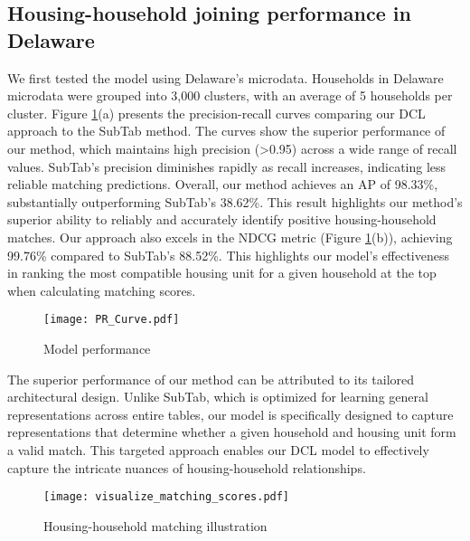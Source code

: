 \documentclass[]{nature_mod}
\begin{document}
\subsection{Housing-household joining performance in Delaware}\label{sec:hu_matching}

We first tested the model using Delaware's microdata. Households in Delaware microdata were grouped into 3,000 clusters, with an average of 5 households per cluster. Figure \ref{fig:pr_curves}(a) presents the precision-recall curves comparing our DCL approach to the SubTab method. The curves show the superior performance of our method, which maintains high precision (>0.95) across a wide range of recall values. SubTab's precision diminishes rapidly as recall increases, indicating less reliable matching predictions. Overall, our method achieves an AP of 98.33\%, substantially outperforming SubTab's 38.62\%. This result highlights our method's superior ability to reliably and accurately identify positive housing-household matches. Our approach also excels in the NDCG metric (Figure \ref{fig:pr_curves}(b)), achieving 99.76\% compared to SubTab's 88.52\%. This highlights our model's effectiveness in ranking the most compatible housing unit for a given household at the top when calculating matching scores.

\begin{figure}[!ht]
  \centering
  \texttt{[image: PR\_Curve.pdf]}
  \caption{Model performance}
  \label{fig:pr_curves}
\end{figure}

The superior performance of our method can be attributed to its tailored architectural design. Unlike SubTab, which is optimized for learning general representations across entire tables, our model is specifically designed to capture representations that determine whether a given household and housing unit form a valid match. This targeted approach enables our DCL model to effectively capture the intricate nuances of housing-household relationships.

\begin{figure}[!ht]
  \centering
  \texttt{[image: visualize\_matching\_scores.pdf]}
  \caption{Housing-household matching illustration}
  \label{fig:matching_scores}
\end{figure}
\end{document}

